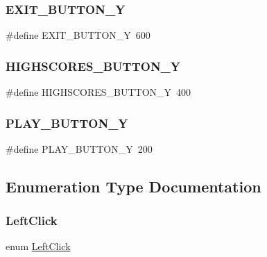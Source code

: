 \subsubsection{\texorpdfstring{EXIT\_BUTTON\_Y}{EXIT\_BUTTON\_Y}}
{\footnotesize\ttfamily \#define E\+X\+I\+T\+\_\+\+B\+U\+T\+T\+O\+N\+\_\+Y~600}

\mbox{\label{group__menu_gad6554b0db395ff6f8ad6d1ea11988b3a}} 
\subsubsection{\texorpdfstring{HIGHSCORES\_BUTTON\_Y}{HIGHSCORES\_BUTTON\_Y}}
{\footnotesize\ttfamily \#define H\+I\+G\+H\+S\+C\+O\+R\+E\+S\+\_\+\+B\+U\+T\+T\+O\+N\+\_\+Y~400}

\mbox{\label{group__menu_ga6c389840e668d04350b29c13c2650a20}} 
\subsubsection{\texorpdfstring{PLAY\_BUTTON\_Y}{PLAY\_BUTTON\_Y}}
{\footnotesize\ttfamily \#define P\+L\+A\+Y\+\_\+\+B\+U\+T\+T\+O\+N\+\_\+Y~200}



\subsection{Enumeration Type Documentation}
\mbox{\label{group__menu_ga6cd15c139ec2e31ed2f511e39e296376}} 
\subsubsection{\texorpdfstring{LeftClick}{LeftClick}}
{\footnotesize\ttfamily enum \mbox{\hyperlink{group__menu_ga6cd15c139ec2e31ed2f511e39e296376}{Left\+Click}}}

